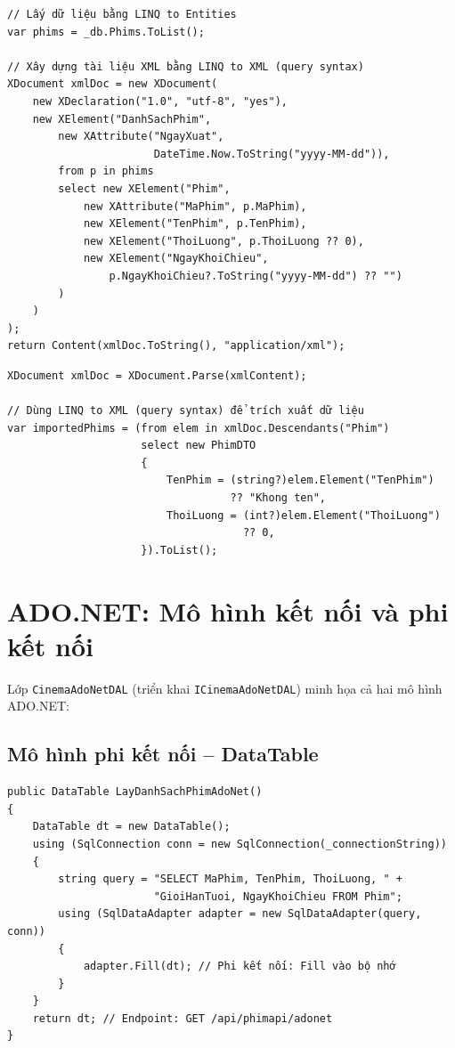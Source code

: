 \documentclass[12pt,a4paper,oneside]{book}
\theoremstyle{plain}
\numberwithin{equation}{chapter}
\begin{document}
\begin{lstlisting}[style=csharpstyle, caption={LINQ to XML -- Export phim ra XML}]
// Lấy dữ liệu bằng LINQ to Entities
var phims = _db.Phims.ToList();

// Xây dựng tài liệu XML bằng LINQ to XML (query syntax)
XDocument xmlDoc = new XDocument(
    new XDeclaration("1.0", "utf-8", "yes"),
    new XElement("DanhSachPhim",
        new XAttribute("NgayXuat", 
                       DateTime.Now.ToString("yyyy-MM-dd")),
        from p in phims
        select new XElement("Phim",
            new XAttribute("MaPhim", p.MaPhim),
            new XElement("TenPhim", p.TenPhim),
            new XElement("ThoiLuong", p.ThoiLuong ?? 0),
            new XElement("NgayKhoiChieu",
                p.NgayKhoiChieu?.ToString("yyyy-MM-dd") ?? "")
        )
    )
);
return Content(xmlDoc.ToString(), "application/xml");
\end{lstlisting}

\begin{lstlisting}[style=csharpstyle, caption={LINQ to XML -- Import phim từ XML}]
XDocument xmlDoc = XDocument.Parse(xmlContent);

// Dùng LINQ to XML (query syntax) để trích xuất dữ liệu
var importedPhims = (from elem in xmlDoc.Descendants("Phim")
                     select new PhimDTO
                     {
                         TenPhim = (string?)elem.Element("TenPhim")
                                   ?? "Khong ten",
                         ThoiLuong = (int?)elem.Element("ThoiLuong") 
                                     ?? 0,
                     }).ToList();
\end{lstlisting}

\section{ADO.NET: Mô hình kết nối và phi kết nối}\label{Sec4.3}

\noindent Lớp \texttt{CinemaAdoNetDAL} (triển khai \texttt{ICinemaAdoNetDAL}) minh họa cả hai mô hình ADO.NET:

\subsection{Mô hình phi kết nối -- DataTable}\label{sub4.3.1}

\begin{lstlisting}[style=csharpstyle, caption={ADO.NET -- SqlDataAdapter + DataTable (phi kết nối)}]
public DataTable LayDanhSachPhimAdoNet()
{
    DataTable dt = new DataTable();
    using (SqlConnection conn = new SqlConnection(_connectionString))
    {
        string query = "SELECT MaPhim, TenPhim, ThoiLuong, " +
                       "GioiHanTuoi, NgayKhoiChieu FROM Phim";
        using (SqlDataAdapter adapter = new SqlDataAdapter(query, conn))
        {
            adapter.Fill(dt); // Phi kết nối: Fill vào bộ nhớ
        }
    }
    return dt; // Endpoint: GET /api/phimapi/adonet
}
\end{lstlisting}
\end{document}
